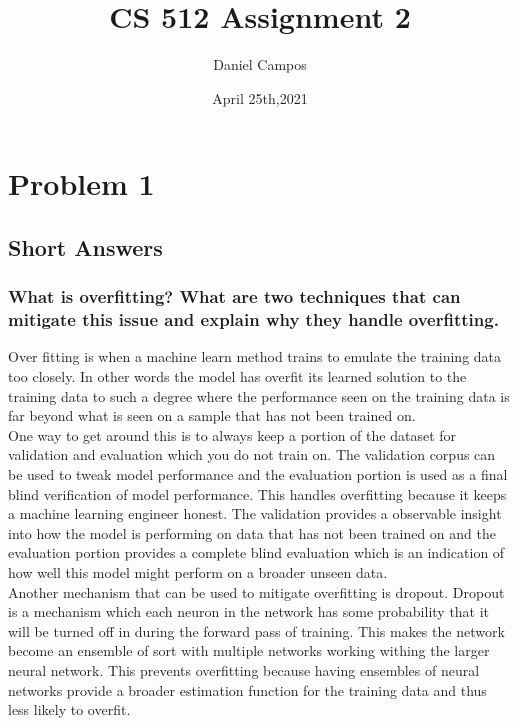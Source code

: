 \documentclass[11pt]{article}
\title{CS 512 Assignment 2}
\author{Daniel Campos}
\date{April 25th,2021}
\begin{document}
\maketitle
\section{Problem 1}
\subsection{Short Answers}
\subsubsection{What is overfitting? What are two techniques that can mitigate this issue and explain why they handle overfitting.}
Over fitting is when a machine learn method trains to emulate the training data too closely. In other words the model has overfit its learned solution to the training data to such a degree where the performance seen on the training data is far beyond what is seen on a sample that has not been trained on. \\
One way to get around this is to always keep a portion of the dataset for validation and evaluation which you do not train on. The validation corpus can be used to tweak model performance and the evaluation portion is used as a final blind verification of model performance. This handles overfitting because it keeps a machine learning engineer honest. The validation provides a observable insight into how the model is performing on data that has not been trained on and the evaluation portion provides a complete blind evaluation which is an indication of how well this model might perform on a broader unseen data.\\
Another mechanism that can be used to mitigate overfitting is dropout. Dropout is a mechanism which each neuron in the network has some probability that it will be turned off in during the forward pass of training. This makes the network become an ensemble of sort with multiple networks working withing the larger neural network. This prevents overfitting because having ensembles of neural networks provide a broader estimation function for the training data and thus less likely to overfit. 
\end{document}

